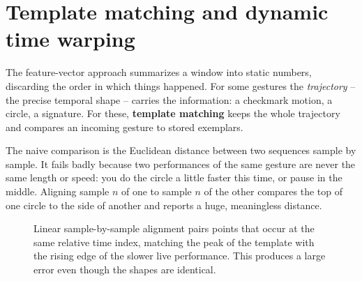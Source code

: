 \section{Template matching and dynamic time warping}
\label{ch38:dtw}

The feature-vector approach summarizes a window into static numbers, discarding
the order in which things happened. For some gestures the \emph{trajectory} --
the precise temporal shape -- carries the information: a checkmark motion, a circle, a
signature. For these, \textbf{template matching} keeps the whole trajectory and
compares an incoming gesture to stored exemplars.

The naive comparison is the Euclidean distance between two sequences sample by
sample. It fails badly because two performances of the same gesture are never the
same length or speed: you do the circle a little faster this time, or pause in the
middle. Aligning sample $n$ of one to sample $n$ of the other compares the top of
one circle to the side of another and reports a huge, meaningless distance.

\begin{figure}[H]
\centering
{}
\caption{Linear sample-by-sample alignment pairs points that occur at the same relative time index, matching the peak of the template with the rising edge of the slower live performance. This produces a large error even though the shapes are identical.}
\label{ch38:fig-linear-alignment}
\end{figure}

